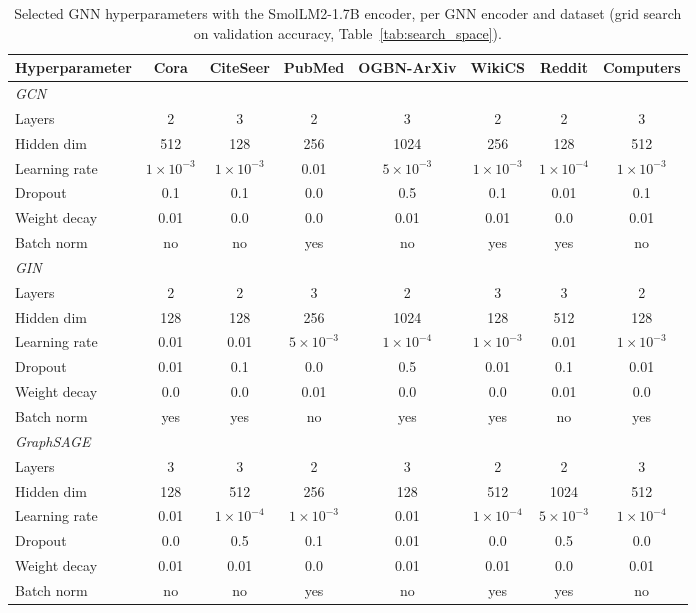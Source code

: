 \documentclass[a4paper,fleqn]{cas-sc}
\begin{document}
\begin{table}[htbp]
\centering\color{red}
\caption{Selected GNN hyperparameters with the SmolLM2-1.7B encoder, per GNN encoder and dataset (grid search on validation accuracy, Table~\ref{tab:search_space}).}
\label{tab:gnn_hp_smollm}
\footnotesize
\setlength{\tabcolsep}{3pt}
\begin{tabular*}{\textwidth}{@{\extracolsep{\fill}} lccccccc @{}}
\toprule
\textbf{Hyperparameter} & \textbf{Cora} & \textbf{CiteSeer} & \textbf{PubMed} & \textbf{OGBN-ArXiv} & \textbf{WikiCS} & \textbf{Reddit} & \textbf{Computers} \\
\midrule
\multicolumn{8}{l}{\textit{GCN}} \\
\midrule
Layers & 2 & 3 & 2 & 3 & 2 & 2 & 3 \\
Hidden dim & 512 & 128 & 256 & 1024 & 256 & 128 & 512 \\
Learning rate & $1\times10^{-3}$ & $1\times10^{-3}$ & 0.01 & $5\times10^{-3}$ & $1\times10^{-3}$ & $1\times10^{-4}$ & $1\times10^{-3}$ \\
Dropout & 0.1 & 0.1 & 0.0 & 0.5 & 0.1 & 0.01 & 0.1 \\
Weight decay & 0.01 & 0.0 & 0.0 & 0.01 & 0.01 & 0.0 & 0.01 \\
Batch norm & no & no & yes & no & yes & yes & no \\
\midrule
\multicolumn{8}{l}{\textit{GIN}} \\
\midrule
Layers & 2 & 2 & 3 & 2 & 3 & 3 & 2 \\
Hidden dim & 128 & 128 & 256 & 1024 & 128 & 512 & 128 \\
Learning rate & 0.01 & 0.01 & $5\times10^{-3}$ & $1\times10^{-4}$ & $1\times10^{-3}$ & 0.01 & $1\times10^{-3}$ \\
Dropout & 0.01 & 0.1 & 0.0 & 0.5 & 0.01 & 0.1 & 0.01 \\
Weight decay & 0.0 & 0.0 & 0.01 & 0.0 & 0.0 & 0.01 & 0.0 \\
Batch norm & yes & yes & no & yes & yes & no & yes \\
\midrule
\multicolumn{8}{l}{\textit{GraphSAGE}} \\
\midrule
Layers & 3 & 3 & 2 & 3 & 2 & 2 & 3 \\
Hidden dim & 128 & 512 & 256 & 128 & 512 & 1024 & 512 \\
Learning rate & 0.01 & $1\times10^{-4}$ & $1\times10^{-3}$ & 0.01 & $1\times10^{-4}$ & $5\times10^{-3}$ & $1\times10^{-4}$ \\
Dropout & 0.0 & 0.5 & 0.1 & 0.01 & 0.0 & 0.5 & 0.0 \\
Weight decay & 0.01 & 0.01 & 0.0 & 0.01 & 0.01 & 0.0 & 0.01 \\
Batch norm & no & no & yes & no & yes & yes & no \\
\bottomrule
\end{tabular*}
\end{table}
\end{document}
